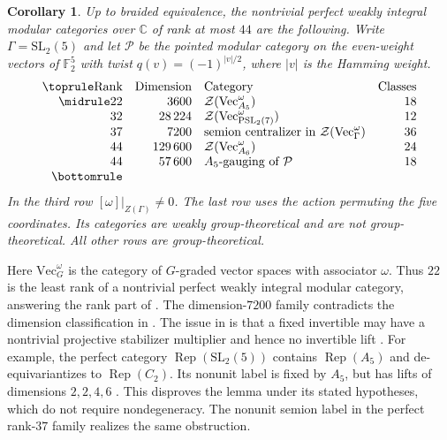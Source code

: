 \documentclass[11pt]{amsart}
\numberwithin{equation}{section}
\newtheorem{corollary}[theorem]{Corollary}
\theoremstyle{definition}
\theoremstyle{plain}
\begin{document}
\begin{corollary}\label{ext:perfect}
Up to braided equivalence, the nontrivial perfect weakly integral
modular categories over $\mathbb C$ of rank at most $44$ are the following.
Write $\Gamma=\mathrm{SL}_2(5)$ and let $\mathcal P$ be the pointed
modular category on the even-weight vectors of $\mathbb F_2^5$ with
twist $q(v)=(-1)^{|v|/2}$, where $|v|$ is the Hamming weight.
\[
\begin{array}{r r l r}
\toprule
\text{Rank}&\text{Dimension}&\text{Category}&\text{Classes}\\
\midrule
22&3600&\mathcal Z(\mathrm{Vec}_{A_5}^{\omega})&18\\
32&28\,224&\mathcal Z(\mathrm{Vec}_{\mathrm{PSL}_2(7)}^{\omega})&12\\
37&7200&\text{semion centralizer in }\mathcal Z(\mathrm{Vec}_\Gamma^{\omega})&36\\
44&129\,600&\mathcal Z(\mathrm{Vec}_{A_6}^{\omega})&24\\
44&57\,600&\text{$A_5$-gauging of }\mathcal P&18\\
\bottomrule
\end{array}
\]
In the third row $[\omega]|_{Z(\Gamma)}\ne0$. The last row uses the
action permuting the five coordinates. Its categories are weakly
group-theoretical and are not group-theoretical. All other rows are
group-theoretical.
\end{corollary}

Here $\mathrm{Vec}_G^\omega$ is the category of $G$-graded vector spaces
with associator $\omega$. Thus $22$ is the least rank of a nontrivial perfect weakly integral
modular category, answering the rank part of \cite[Question~11.8]{BPBurnside}. The dimension-$7200$
family contradicts the dimension classification in \cite{XuDong}.
The issue in \cite[Lemma~3.1]{XuDong} is that a fixed invertible may
have a nontrivial projective stabilizer multiplier and hence no
invertible lift \cite[Corollary~2.13]{BN}. For example, the perfect category
$\operatorname{Rep}(\mathrm{SL}_2(5))$ contains $\operatorname{Rep}(A_5)$
and de-equivariantizes to $\operatorname{Rep}(C_2)$. Its nonunit label
is fixed by $A_5$, but has lifts of dimensions $2,2,4,6$
\cite[Table~2]{KacTodorov}. This disproves the lemma under its stated
hypotheses, which do not require nondegeneracy. The nonunit semion
label in the perfect rank-$37$ family realizes the same obstruction.
\medskip
\end{document}

